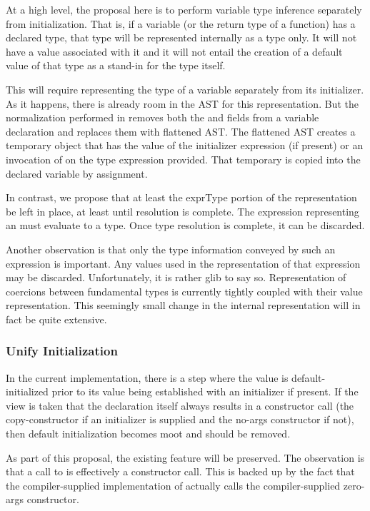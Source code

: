 At a high level, the proposal here is to perform variable type inference separately from
initialization.  That is, if a variable (or the return type of a function) has a declared type, that type will be represented internally as a type only.  It
will not have a value associated with it and it will not entail the creation of a default
value of that type as a stand-in for the type itself.

This will require representing the type of a variable separately from its
initializer.  As it happens, there is already room in the AST for this representation.
But the normalization performed in  removes both the 
and  fields from a variable declaration and replaces them with flattened AST.
The flattened AST creates a temporary object that has the value of the initializer
expression (if present) or an invocation of  on the type expression
provided.  That temporary is copied into the declared variable by assignment.  

In contrast, we propose that at least the exprType portion of the representation be left in
place, at least until resolution is complete.
The expression representing an  must evaluate to a type.  Once type
resolution is complete, it can be discarded.  

Another observation is that only the type information conveyed by such an expression is
important.  Any values used in the representation of that expression may be discarded.
Unfortunately, it is rather glib to say so.  Representation of coercions between
fundamental types is currently tightly coupled with their value representation.  This
seemingly small change in the internal representation will in fact be quite extensive.

\subsubsection{Unify Initialization}

In the current implementation, there is a step where the value is default-initialized
prior to its value being established with an initializer if present.  If the view is taken
that the declaration itself always results in a constructor call (the copy-constructor if
an initializer is supplied and the no-args constructor if not), then default
initialization becomes moot and should be removed.

As part of this proposal, the existing  feature will be preserved.  The
observation is that a call to  is effectively a constructor call.  This
is backed up by the fact that the compiler-supplied implementation of 
actually calls the compiler-supplied zero-args constructor.  

